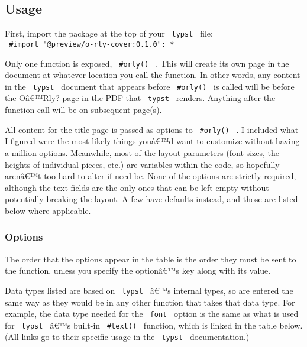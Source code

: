 \subsection{Usage}\label{usage}

First, import the package at the top of your \texttt{\ typst\ } file:
\texttt{\ \#import\ "@preview/o-rly-cover:0.1.0":\ *\ }

Only one function is exposed, \texttt{\ \#orly()\ } . This will create
its own page in the document at whatever location you call the function.
In other words, any content in the \texttt{\ typst\ } document that
appears before \texttt{\ \#orly()\ } is called will be before the
Oâ€™Rly? page in the PDF that \texttt{\ typst\ } renders. Anything after
the function call will be on subsequent page(s).

All content for the title page is passed as options to
\texttt{\ \#orly()\ } . I included what I figured were the most likely
things youâ€™d want to customize without having a million options.
Meanwhile, most of the layout parameters (font sizes, the heights of
individual pieces, etc.) are variables within the code, so hopefully
arenâ€™t too hard to alter if need-be. None of the options are strictly
required, although the text fields are the only ones that can be left
empty without potentially breaking the layout. A few have defaults
instead, and those are listed below where applicable.

\subsubsection{Options}\label{options}

The order that the options appear in the table is the order they must be
sent to the function, unless you specify the optionâ€™s key along with
its value.

Data types listed are based on \texttt{\ typst\ } â€™s internal types,
so are entered the same way as they would be in any other function that
takes that data type. For example, the data type needed for the
\texttt{\ font\ } option is the same as what is used for
\texttt{\ typst\ } â€™s built-in \texttt{\ \#text()\ } function, which
is linked in the table below. (All links go to their specific usage in
the \texttt{\ typst\ } documentation.)

